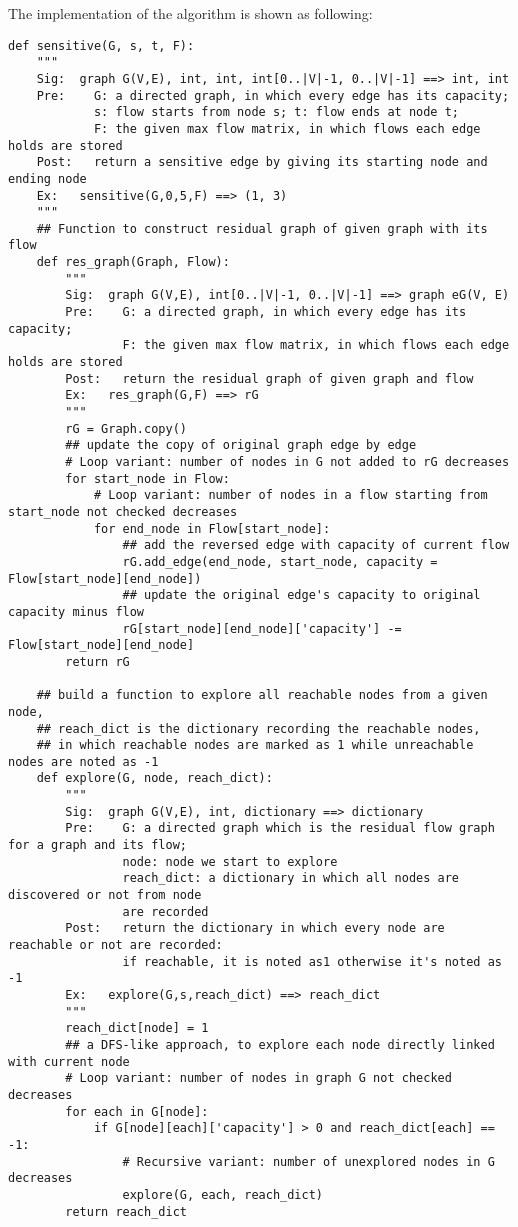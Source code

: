 \documentclass[a4paper,11pt]{article}
\begin{document}
The implementation of the algorithm is shown as following: 
\begin{lstlisting}
def sensitive(G, s, t, F):
    """
    Sig:  graph G(V,E), int, int, int[0..|V|-1, 0..|V|-1] ==> int, int
    Pre:    G: a directed graph, in which every edge has its capacity;
            s: flow starts from node s; t: flow ends at node t;
            F: the given max flow matrix, in which flows each edge holds are stored
    Post:   return a sensitive edge by giving its starting node and ending node
    Ex:   sensitive(G,0,5,F) ==> (1, 3)
    """
    ## Function to construct residual graph of given graph with its flow
    def res_graph(Graph, Flow):
        """
        Sig:  graph G(V,E), int[0..|V|-1, 0..|V|-1] ==> graph eG(V, E)
        Pre:    G: a directed graph, in which every edge has its capacity;
                F: the given max flow matrix, in which flows each edge holds are stored
        Post:   return the residual graph of given graph and flow
        Ex:   res_graph(G,F) ==> rG
        """
        rG = Graph.copy()
        ## update the copy of original graph edge by edge
        # Loop variant: number of nodes in G not added to rG decreases
        for start_node in Flow:
            # Loop variant: number of nodes in a flow starting from start_node not checked decreases
            for end_node in Flow[start_node]:
                ## add the reversed edge with capacity of current flow
                rG.add_edge(end_node, start_node, capacity = Flow[start_node][end_node])
                ## update the original edge's capacity to original capacity minus flow
                rG[start_node][end_node]['capacity'] -= Flow[start_node][end_node]
        return rG

    ## build a function to explore all reachable nodes from a given node,
    ## reach_dict is the dictionary recording the reachable nodes,
    ## in which reachable nodes are marked as 1 while unreachable nodes are noted as -1
    def explore(G, node, reach_dict):
        """
        Sig:  graph G(V,E), int, dictionary ==> dictionary
        Pre:    G: a directed graph which is the residual flow graph for a graph and its flow;
                node: node we start to explore
                reach_dict: a dictionary in which all nodes are discovered or not from node
                are recorded
        Post:   return the dictionary in which every node are reachable or not are recorded:
                if reachable, it is noted as1 otherwise it's noted as -1
        Ex:   explore(G,s,reach_dict) ==> reach_dict
        """
        reach_dict[node] = 1
        ## a DFS-like approach, to explore each node directly linked with current node
        # Loop variant: number of nodes in graph G not checked decreases
        for each in G[node]:
            if G[node][each]['capacity'] > 0 and reach_dict[each] == -1:
                # Recursive variant: number of unexplored nodes in G decreases
                explore(G, each, reach_dict)
        return reach_dict


\end{lstlisting}
\end{document}

